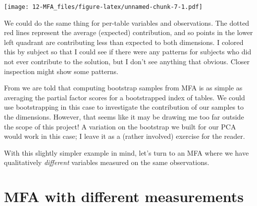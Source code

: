 \documentclass[
]{book}
\begin{document}
\texttt{[image: 12-MFA\_files/figure-latex/unnamed-chunk-7-1.pdf]}

We could do the same thing for per-table variables and observations. The dotted red lines represent the average (expected) contribution, and so points in the lower left quadrant are contributing less than expected to both dimensions. I colored this by subject so that I could see if there were any patterns for subjects who did not ever contribute to the solution, but I don't see anything that obvious. Closer inspection might show some patterns.

From \citet[11-12]{abdiMultiple2013} we are told that computing bootstrap samples from MFA is as simple as averaging the partial factor scores for a bootstrapped index of tables. We could use bootstrapping in this case to investigate the contribution of our samples to the dimensions. However, that seems like it may be drawing me too far outside the scope of this project! A variation on the bootstrap we built for our PCA would work in this case; I leave it as a (rather involved) exercise for the reader.

With this slightly simpler example in mind, let's turn to an MFA where we have qualitatively \emph{different} variables measured on the same observations.

\section{MFA with different measurements}\label{mfa-with-different-measurements}
\end{document}
